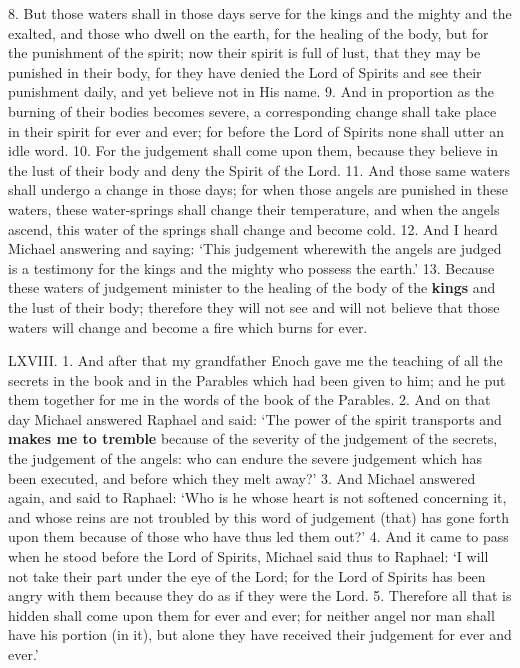 8. But those waters shall in those days serve for
the kings and the mighty and the exalted, and those
who dwell on the earth, for the healing of the body,
but for the punishment of the spirit; now their
spirit is full of lust, that they may be punished in
their body, for they have denied the Lord of Spirits
and see their punishment daily, and yet believe not
in His name. 9. And in proportion as the burning
of their bodies becomes severe, a corresponding change
shall take place in their spirit for ever and ever; for
before the Lord of Spirits none shall utter an idle
word. 10. For the judgement shall come upon
them, because they believe in the lust of their body
and deny the Spirit of the Lord. 11. And those same
waters shall undergo a change in those days; for
when those angels are punished in these waters, these
water-springs shall change their temperature, and
when the angels ascend, this water of the springs
shall change and become cold. 12. And I heard
Michael answering and saying: ‘This judgement
wherewith the angels are judged is a testimony for
the kings and the mighty who possess the earth.’
13. Because these waters of judgement minister to
the healing of the body of the \textbf{kings} and the lust of
their body; therefore they will not see and will not
believe that those waters will change and become
a fire which burns for ever.


LXVIII. 1. And after that my grandfather Enoch
gave me the teaching of all the secrets in the book and
in the Parables which had been given to him; and he
put them together for me in the words of the book of
the Parables. 2. And on that day Michael answered
Raphael and said: ‘The power of the spirit transports
and \textbf{makes me to tremble} because of the severity
of the judgement of the secrets, the judgement of the
angels: who can endure the severe judgement which
has been executed, and before which they melt
away?’ 3. And Michael answered again, and said
to Raphael: ‘Who is he whose heart is not softened
concerning it, and whose reins are not troubled by
this word of judgement (that) has gone forth upon
them because of those who have thus led them out?’
4. And it came to pass when he stood before the Lord
of Spirits, Michael said thus to Raphael: ‘I will not
take their part under the eye of the Lord; for the
Lord of Spirits has been angry with them because they
do as if they were the Lord. 5. Therefore all that is
hidden shall come upon them for ever and ever; for
neither angel nor man shall have his portion (in it),
but alone they have received their judgement for
ever and ever.’

